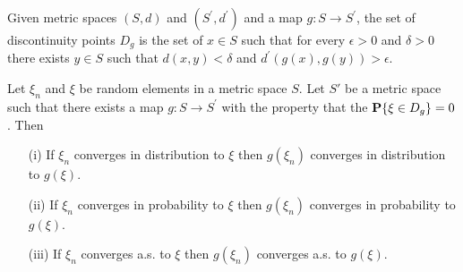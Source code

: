 \begin{defn} Given metric spaces $(S,d)$ and $(S^\prime, d^\prime)$ and a map $g: S \to S^\prime$,
  the set of discontinuity points $D_g$ is the set of $x \in S$ such
  that for every $\epsilon > 0$ and $\delta > 0$ there exists $y \in
  S$ such that $d(x,y) < \delta$ and $d^\prime(g(x), g(y)) > \epsilon$.
\end{defn}
\begin{thm}\label{ContinuousMappingTheorem}Let $\xi_n$ and $\xi$ be random
  elements in a metric space $S$.  Let $S'$ be a metric space such that
  there exists a map $g: S \to S^\prime$ with the property that the
  $\textbf{P}\{\xi \in D_g\} = 0$.  Then 
\begin{itemize}
\item[(i)] If $\xi_n$ converges in distribution to $\xi$ then
  $g(\xi_n)$ converges in distribution to $g(\xi)$.
\item[(ii)] If $\xi_n$ converges in probability to $\xi$ then
  $g(\xi_n)$ converges in probability to $g(\xi)$.
\item[(iii)] If $\xi_n$ converges a.s. to $\xi$ then
  $g(\xi_n)$ converges a.s. to $g(\xi)$.
\end{itemize}
\end{thm}
